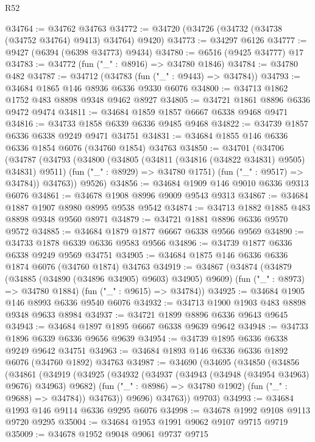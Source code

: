 \begin{lexlean}{R52}
\begin{coremodule}
@34764 := @34762 @34763
@34772 := @34720 (@34726 (@34732 (@34738 (@34752 @34764) @9413) @34764) @9420)
@34773 := @34297 @6126
@34777 := @9427 (@6394 (@6398 @34773) @9434)
@34780 := @6516 (@9425 @34777) @17
@34783 := @34772 (fun ("_" : @8916) => @34780 @1846)
@34784 := @34780 @482
@34787 := @34712 (@34783 (fun ("_" : @9443) => @34784))
@34793 := @34684 @1865 @146 @8936 @6336 @9330 @6076
@34800 := @34713 @1862 @1752 @483 @8898 @9348 @9462 @8927
@34805 := @34721 @1861 @8896 @6336 @9472 @9474
@34811 := @34684 @1859 @1857 @6667 @6338 @9468 @9471
@34816 := @34733 @1858 @6339 @6336 @9485 @9468
@34822 := @34739 @1857 @6336 @6338 @9249 @9471 @34751
@34831 := @34684 @1855 @146 @6336 @6336 @1854 @6076 (@34760 @1854) @34763
@34850 := @34701
    (@34706
      (@34787
        (@34793
          (@34800
            (@34805 (@34811 (@34816 (@34822 @34831) @9505) @34831) @9511)
            (fun ("_" : @8929) => @34780 @1751)
            (fun ("_" : @9517) => @34784))
          @34763))
      @9526)
@34856 := @34684 @1909 @146 @9010 @6336 @9313 @6076
@34861 := @34678 @1908 @8996 @9009 @9543 @9313
@34867 := @34684 @1887 @1907 @8980 @8995 @9538 @9542
@34874 := @34713 @1882 @1885 @483 @8898 @9348 @9560 @8971
@34879 := @34721 @1881 @8896 @6336 @9570 @9572
@34885 := @34684 @1879 @1877 @6667 @6338 @9566 @9569
@34890 := @34733 @1878 @6339 @6336 @9583 @9566
@34896 := @34739 @1877 @6336 @6338 @9249 @9569 @34751
@34905 := @34684 @1875 @146 @6336 @6336 @1874 @6076 (@34760 @1874) @34763
@34919 := @34867
    (@34874
      (@34879 (@34885 (@34890 (@34896 @34905) @9603) @34905) @9609)
      (fun ("_" : @8973) => @34780 @1884)
      (fun ("_" : @9615) => @34784))
@34925 := @34684 @1905 @146 @8993 @6336 @9540 @6076
@34932 := @34713 @1900 @1903 @483 @8898 @9348 @9633 @8984
@34937 := @34721 @1899 @8896 @6336 @9643 @9645
@34943 := @34684 @1897 @1895 @6667 @6338 @9639 @9642
@34948 := @34733 @1896 @6339 @6336 @9656 @9639
@34954 := @34739 @1895 @6336 @6338 @9249 @9642 @34751
@34963 := @34684 @1893 @146 @6336 @6336 @1892 @6076 (@34760 @1892) @34763
@34987 := @34690
    (@34695
      (@34850
        (@34856
          (@34861
            (@34919
              (@34925
                (@34932
                  (@34937 (@34943 (@34948 (@34954 @34963) @9676) @34963) @9682)
                  (fun ("_" : @8986) => @34780 @1902)
                  (fun ("_" : @9688) => @34784))
                @34763))
            @9696)
          @34763))
      @9703)
@34993 := @34684 @1993 @146 @9114 @6336 @9295 @6076
@34998 := @34678 @1992 @9108 @9113 @9720 @9295
@35004 := @34684 @1953 @1991 @9062 @9107 @9715 @9719
@35009 := @34678 @1952 @9048 @9061 @9737 @9715

\end{coremodule}
\end{lexlean}
